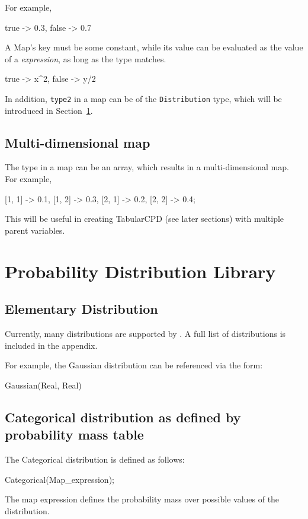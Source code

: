 \documentclass[12pt]{article}
\begin{document}
For example, 
\begin{blogcode}
 {true -> 0.3, false -> 0.7}
\end{blogcode}

A Map's key must be some constant, while its value can be evaluated as the value of a \emph{expression}, as long as the type matches.
\begin{blogcode}
{true -> x^2, false -> y/2}
\end{blogcode}

In addition, \texttt{type2} in a map can be of the \texttt{Distribution} type, which will be introduced in Section~\ref{sec:distribution}.

\subsection{Multi-dimensional map}
The type in a map can be an array, which results in a multi-dimensional map.
For example,
\begin{blogcode}
{[1, 1] -> 0.1, [1, 2] -> 0.3, [2, 1] -> 0.2, [2, 2] -> 0.4};
\end{blogcode}

This will be useful in creating TabularCPD (see later sections) with multiple parent variables.


\section{Probability Distribution Library}
\label{sec:distribution}

\subsection{Elementary Distribution}
Currently, many distributions are supported by \bl. A full list of distributions is included in the appendix. 

For example, the Gaussian distribution can be referenced via the form:
\begin{blogcode}
Gaussian(Real, Real)
\end{blogcode}

\subsection{Categorical distribution as defined by probability mass table}

The Categorical distribution is defined as follows:
\begin{blogcode}
Categorical(Map_expression);
\end{blogcode}
The map expression defines the probability mass over possible values of the distribution.
\end{document}
